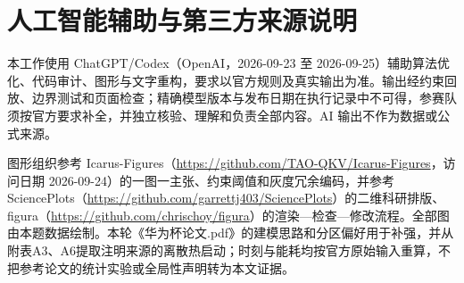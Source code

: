 \section{人工智能辅助与第三方来源说明}
本工作使用 ChatGPT/Codex（OpenAI，2026-09-23 至 2026-09-25）辅助算法优化、代码审计、图形与文字重构，要求以官方规则及真实输出为准。输出经约束回放、边界测试和页面检查；精确模型版本与发布日期在执行记录中不可得，参赛队须按官方要求补全，并独立核验、理解和负责全部内容。AI 输出不作为数据或公式来源。

图形组织参考 Icarus-Figures（\url{https://github.com/TAO-QKV/Icarus-Figures}，访问日期 2026-09-24）的一图一主张、约束阈值和灰度冗余编码，并参考 SciencePlots（\url{https://github.com/garrettj403/SciencePlots}）的二维科研排版、figura（\url{https://github.com/chrischoy/figura}）的渲染—检查—修改流程。全部图由本题数据绘制。本轮《华为杯论文.pdf》的建模思路和分区偏好用于补强，并从附表A3、A6提取注明来源的离散热启动；时刻与能耗均按官方原始输入重算，不把参考论文的统计实验或全局性声明转为本文证据。
